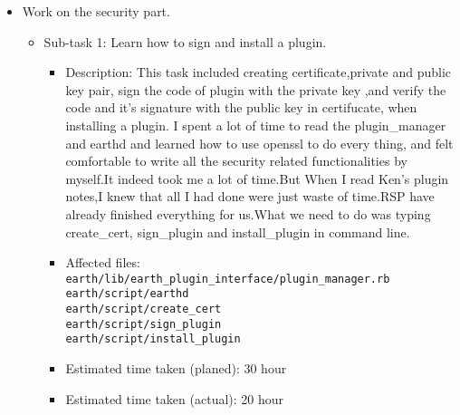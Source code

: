 \documentclass{article}
\begin{document}
\begin{itemize}
\item Work on the security part.
	     \begin{itemize}
              \item Sub-task 1: Learn how to sign and install a plugin.
                \begin{itemize}
	         \item Description: This task included creating certificate,private and public key pair, sign the code of plugin with the private key ,and verify the code and it's signature with the public key in certifucate, when installing a plugin. I spent a lot of time to read the plugin\_manager and earthd and learned how to use openssl to do every thing, and felt comfortable to write all the security related functionalities by myself.It indeed took me a lot of time.But When I read Ken's plugin notes,I knew that all I had done were just waste of time.RSP have already finished everything for us.What we need to do was typing create\_cert, sign\_plugin and install\_plugin in command line. 
	         \item Affected files: \\
                                       \texttt{earth/lib/earth\_plugin\_interface/plugin\_manager.rb}\\
                                        \texttt{earth/script/earthd}\\
                                        \texttt{earth/script/create\_cert}\\
                                        \texttt{earth/script/sign\_plugin}\\
                                        \texttt{earth/script/install\_plugin}\\ 
	      
	          \item Estimated time taken (planed): 30 hour
                  \item Estimated time taken (actual): 20 hour
	     \end{itemize}
             \end{itemize}


\end{itemize}
\end{document}
